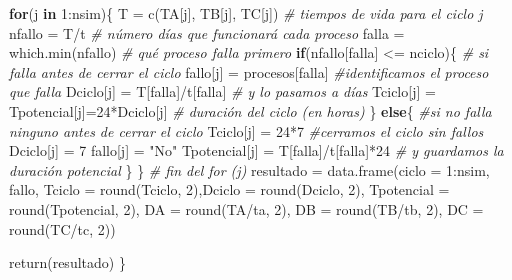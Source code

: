 \documentclass[
]{book}
\newenvironment{Shaded}{\begin{snugshade}}{\end{snugshade}}
\newcommand{\AttributeTok}[1]{\textcolor[rgb]{0.77,0.63,0.00}{#1}}
\newcommand{\CommentTok}[1]{\textcolor[rgb]{0.56,0.35,0.01}{\textit{#1}}}
\newcommand{\ControlFlowTok}[1]{\textcolor[rgb]{0.13,0.29,0.53}{\textbf{#1}}}
\newcommand{\DecValTok}[1]{\textcolor[rgb]{0.00,0.00,0.81}{#1}}
\newcommand{\FunctionTok}[1]{\textcolor[rgb]{0.00,0.00,0.00}{#1}}
\newcommand{\NormalTok}[1]{#1}
\newcommand{\OtherTok}[1]{\textcolor[rgb]{0.56,0.35,0.01}{#1}}
\newcommand{\SpecialCharTok}[1]{\textcolor[rgb]{0.00,0.00,0.00}{#1}}
\newcommand{\StringTok}[1]{\textcolor[rgb]{0.31,0.60,0.02}{#1}}
\theoremstyle{definition}
\theoremstyle{definition}
\theoremstyle{definition}
\theoremstyle{definition}
\theoremstyle{remark}
\begin{document}
\begin{Shaded}
\begin{Highlighting}[]
\ControlFlowTok{for}\NormalTok{(j }\ControlFlowTok{in} \DecValTok{1}\SpecialCharTok{:}\NormalTok{nsim)\{}
\NormalTok{  T }\OtherTok{=} \FunctionTok{c}\NormalTok{(TA[j], TB[j], TC[j])      }\CommentTok{\# tiempos de vida para el ciclo j}
\NormalTok{  nfallo }\OtherTok{=}\NormalTok{ T}\SpecialCharTok{/}\NormalTok{t                  }\CommentTok{\# número días que funcionará cada proceso}
\NormalTok{  falla }\OtherTok{=} \FunctionTok{which.min}\NormalTok{(nfallo)     }\CommentTok{\# qué proceso falla primero}
  \ControlFlowTok{if}\NormalTok{(nfallo[falla] }\SpecialCharTok{\textless{}=}\NormalTok{ nciclo)\{  }\CommentTok{\# si falla antes de cerrar el ciclo}
\NormalTok{   fallo[j] }\OtherTok{=}\NormalTok{ procesos[falla]   }\CommentTok{\#identificamos el proceso que falla}
\NormalTok{   Dciclo[j] }\OtherTok{=}\NormalTok{ T[falla]}\SpecialCharTok{/}\NormalTok{t[falla]   }\CommentTok{\# y lo pasamos a días}
\NormalTok{   Tciclo[j] }\OtherTok{=}\NormalTok{ Tpotencial[j]}\OtherTok{=}\DecValTok{24}\SpecialCharTok{*}\NormalTok{Dciclo[j]   }\CommentTok{\# duración del ciclo (en horas)}
\NormalTok{  \}}
  \ControlFlowTok{else}\NormalTok{\{                       }\CommentTok{\#si no falla ninguno antes de cerrar el ciclo}
\NormalTok{    Tciclo[j] }\OtherTok{=} \DecValTok{24}\SpecialCharTok{*}\DecValTok{7}            \CommentTok{\#cerramos el ciclo sin fallos}
\NormalTok{    Dciclo[j] }\OtherTok{=} \DecValTok{7}
\NormalTok{    fallo[j] }\OtherTok{=} \StringTok{"No"}
\NormalTok{    Tpotencial[j] }\OtherTok{=}\NormalTok{ T[falla]}\SpecialCharTok{/}\NormalTok{t[falla]}\SpecialCharTok{*}\DecValTok{24}    \CommentTok{\# y guardamos la duración potencial }
\NormalTok{  \}}
\NormalTok{\} }\CommentTok{\# fin del for (j)}
\NormalTok{resultado }\OtherTok{=} \FunctionTok{data.frame}\NormalTok{(}\AttributeTok{ciclo =} \DecValTok{1}\SpecialCharTok{:}\NormalTok{nsim, fallo,}
                     \AttributeTok{Tciclo =} \FunctionTok{round}\NormalTok{(Tciclo, }\DecValTok{2}\NormalTok{),}\AttributeTok{Dciclo =} \FunctionTok{round}\NormalTok{(Dciclo, }\DecValTok{2}\NormalTok{),}
                     \AttributeTok{Tpotencial =} \FunctionTok{round}\NormalTok{(Tpotencial, }\DecValTok{2}\NormalTok{),}
                     \AttributeTok{DA =} \FunctionTok{round}\NormalTok{(TA}\SpecialCharTok{/}\NormalTok{ta, }\DecValTok{2}\NormalTok{), }\AttributeTok{DB =} \FunctionTok{round}\NormalTok{(TB}\SpecialCharTok{/}\NormalTok{tb, }\DecValTok{2}\NormalTok{), }\AttributeTok{DC =} \FunctionTok{round}\NormalTok{(TC}\SpecialCharTok{/}\NormalTok{tc, }\DecValTok{2}\NormalTok{))}

\FunctionTok{return}\NormalTok{(resultado)}
\NormalTok{\}}
\end{Highlighting}
\end{Shaded}
\end{document}
